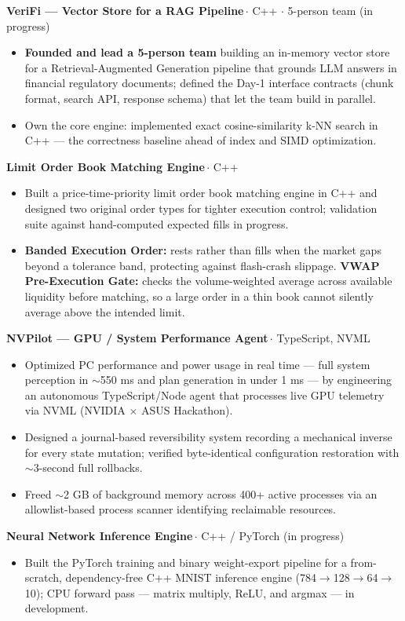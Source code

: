 \documentclass[letterpaper,10pt]{article}
\newcommand{\bull}[1]{\item\small{#1}}
\newcommand{\projTitle}[2]{%
  \vspace{1pt}
  {\noindent\textbf{#1}\,\textcolor{slate}{\small #2}\par}
  \vspace{-1pt}
}
\begin{document}
\projTitle{VeriFi --- Vector Store for a RAG Pipeline}{$\cdot$ C++ $\cdot$ 5-person team (in progress)}
\begin{itemize}
  \bull{\textbf{Founded and lead a 5-person team} building an in-memory vector store for a Retrieval-Augmented Generation pipeline that grounds LLM answers in financial regulatory documents; defined the Day-1 interface contracts (chunk format, search API, response schema) that let the team build in parallel.}
  \bull{Own the core engine: implemented exact cosine-similarity k-NN search in C++ --- the correctness baseline ahead of index and SIMD optimization.}
\end{itemize}

\projTitle{Limit Order Book Matching Engine}{$\cdot$ C++}
\begin{itemize}
  \bull{Built a price-time-priority limit order book matching engine in C++ and designed two original order types for tighter execution control; validation suite against hand-computed expected fills in progress.}
  \bull{\textbf{Banded Execution Order:} rests rather than fills when the market gaps beyond a tolerance band, protecting against flash-crash slippage. \textbf{VWAP Pre-Execution Gate:} checks the volume-weighted average across available liquidity before matching, so a large order in a thin book cannot silently average above the intended limit.}
\end{itemize}

\projTitle{NVPilot --- GPU / System Performance Agent}{$\cdot$ TypeScript, NVML}
\begin{itemize}
  \bull{Optimized PC performance and power usage in real time --- full system perception in $\sim$550 ms and plan generation in under 1 ms --- by engineering an autonomous TypeScript/Node agent that processes live GPU telemetry via NVML (NVIDIA $\times$ ASUS Hackathon).}
  \bull{Designed a journal-based reversibility system recording a mechanical inverse for every state mutation; verified byte-identical configuration restoration with $\sim$3-second full rollbacks.}
  \bull{Freed $\sim$2 GB of background memory across 400+ active processes via an allowlist-based process scanner identifying reclaimable resources.}
\end{itemize}

\projTitle{Neural Network Inference Engine}{$\cdot$ C++ / PyTorch (in progress)}
\begin{itemize}
  \bull{Built the PyTorch training and binary weight-export pipeline for a from-scratch, dependency-free C++ MNIST inference engine (784$\rightarrow$128$\rightarrow$64$\rightarrow$10); CPU forward pass --- matrix multiply, ReLU, and argmax --- in development.}
\end{itemize}
\end{document}
